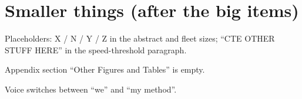 \documentclass[11pt]{article}
\begin{document}
\section*{Smaller things (after the big items)}

\begin{todolist}
    \item Placeholders: X / N / Y / Z in the abstract and fleet sizes; ``CTE OTHER STUFF HERE'' in the speed-threshold paragraph.

    \item Appendix section ``Other Figures and Tables'' is empty.

    \item Voice switches between ``we'' and ``my method''.
\end{todolist}
\end{document}
